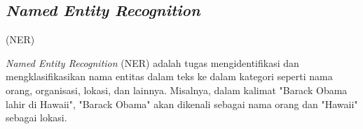 \subsection{\textit{Named Entity Recognition}} (NER)

\textit{Named Entity Recognition} (NER) adalah tugas mengidentifikasi dan mengklasifikasikan nama entitas dalam teks ke dalam kategori seperti nama orang, organisasi, lokasi, dan lainnya. Misalnya, dalam kalimat "Barack Obama lahir di Hawaii", "Barack Obama" akan dikenali sebagai nama orang dan "Hawaii" sebagai lokasi.